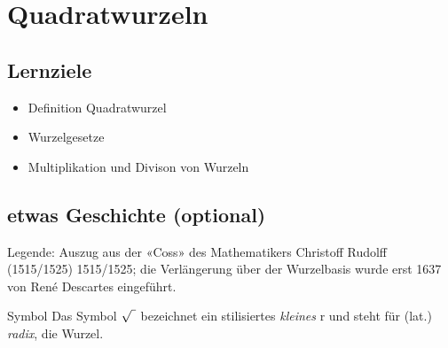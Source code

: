 
\section{Quadratwurzeln}\index{$\sqrt{\mathstrut{}\,}$}

\subsection*{Lernziele}

\begin{itemize}
\item Definition Quadratwurzel
\item Wurzelgesetze
\item Multiplikation und Divison von Wurzeln
\end{itemize}




\newpage
\subsection*{etwas Geschichte (optional)}

\noTRAINER{\vspace{50mm}}



Legende: 
Auszug aus der «Coss» des Mathematikers Christoff
Rudolff\cite{rudolff1515} (1515/1525)  1515/1525; die
Verlängerung über der Wurzelbasis wurde erst 1637 von René Descartes eingeführt.


\begin{bemerkung}{Symbol}{}
Das Symbol $\sqrt{\vphantom{b} \,\,}$
bezeichnet ein stilisiertes {\textit{kleines}} {\huge{r}} und steht für
  (lat.) \textit{radix}, die Wurzel.
\end{bemerkung}

